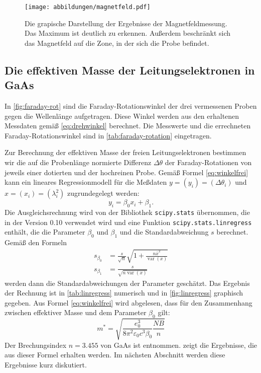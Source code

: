 \begin{figure}
  \centering
  \texttt{[image: abbildungen/magnetfeld.pdf]}
  \caption{Die grapische Darstellung der Ergebnisse der
    Magnetfeldmessung.  Das Maximum ist deutlich zu erkennen.  Außerdem
    beschränkt sich das Magnetfeld auf die Zone, in der sich die Probe
    befindet.}
  \label{fig:magnetfeld}
\end{figure}
\FloatBarrier
\subsection{Die effektiven Masse der Leitungselektronen in GaAs}

In \cref{fig:faraday-rot} sind die Faraday-Rotationswinkel der 
drei vermessenen Proben gegen die Wellenlänge aufgetragen. 
Diese Winkel werden aus den erhaltenen 
Messdaten gemäß \cref{eq:drehwinkel} berechnet. Die Messwerte und 
die errechneten Faraday-Rotationswinkel sind in 
\cref{tab:faraday-rotation} eingetragen.

Zur Berechnung der effektiven Masse der freien Leitungselektronen
bestimmen wir die auf die Probenlänge normierte Differenz $\Delta\theta$ der
Faraday-Rotationen von jeweils einer dotierten und der hochreinen Probe.
Gemäß Formel \eqref{eq:winkelfrei} kann ein lineares Regressionmodell
für die Meßdaten $y = (y_i) = (\Delta\theta_i)$ und $x = (x_i) =
(\lambda_i^2)$ zugrundegelegt werden:
%
\begin{equation}
  \label{eq:linregress}
  y_i = \beta_0 x_i + \beta_1.
\end{equation}
Die Ausgleichsrechnung wird von der Bibliothek \texttt{scipy.stats}
übernommen, die in der Version 0.10 verwendet wird und eine Funktion
\texttt{scipy.stats.linregress} enthält, die die Parameter $\beta_0$ und
$\beta_1$ und die Standardabweichung $s$ berechnet.  Gemäß den Formeln
%
\begin{align}
  \label{eq:stat-formeln}
  s_{\beta_0} &= \frac{s}{\sqrt{n}} \sqrt{1 + \frac{n\bar{x}^2}
    {\operatorname{var}(x)}}\\
  s_{\beta_1} &= \frac{s}{\sqrt{n \operatorname{var}(x)}}
\end{align}
%
werden dann die Standardabweichungen der Parameter geschätzt.  Das
Ergebnis der Rechnung ist in \cref{tab:linregress} numerisch und in
\cref{fig:linregress} graphisch gegeben.  Aus Formel
\eqref{eq:winkelfrei} wird abgelesen, dass für den Zusammenhang zwischen
effektiver Masse und dem Parameter $\beta_0$ gilt:
%
\begin{equation}
m^{*} = \sqrt{\frac{e_0^3}{8\pi^2\varepsilon_0c^3\beta_0} \frac{NB}{n}}
\label{eq:effekt}
\end{equation}
%
Der Brechungsindex $n = \num{3.455}$ von GaAs ist \cite{filmetrics}
entnommen.  zeigt die Ergebnisse, die aus dieser
Formel erhalten werden.  Im nächsten Abschnitt werden diese Ergebnisse
kurz diskutiert.

